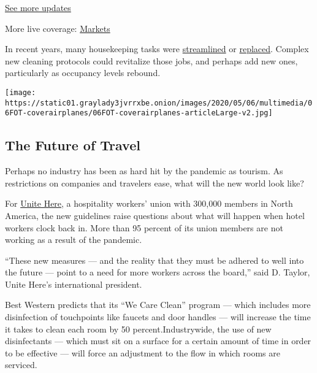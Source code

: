 \href{https://www.nytimes3xbfgragh.onion/2020/09/08/world/covid-19-coronavirus.html?action=click\&pgtype=Article\&state=default\&region=MAIN_CONTENT_1\&context=storylines_live_updates}{See
more updates}

More live coverage:
\href{https://www.nytimes3xbfgragh.onion/live/2020/09/08/business/stock-market-today-coronavirus?action=click\&pgtype=Article\&state=default\&region=MAIN_CONTENT_1\&context=storylines_live_updates}{Markets}

In recent years, many housekeeping tasks were
\href{https://www.nytimes3xbfgragh.onion/2019/11/26/business/hotel-housekeepers.html}{streamlined}
or
\href{https://www.nytimes3xbfgragh.onion/2018/02/27/travel/skipping-hotel-housekeeping-perks.html}{replaced}.
Complex new cleaning protocols could revitalize those jobs, and perhaps
add new ones, particularly as occupancy levels rebound.

\href{https://www.nytimes3xbfgragh.onion/interactive/2020/05/06/travel/coronavirus-travel-questions.html}{}

\texttt{[image: https://static01.graylady3jvrrxbe.onion/images/2020/05/06/multimedia/06FOT-coverairplanes/06FOT-coverairplanes-articleLarge-v2.jpg]}

\hypertarget{the-future-of-travel}{%
\subsection{The Future of Travel}\label{the-future-of-travel}}

Perhaps no industry has been as hard hit by the pandemic as tourism. As
restrictions on companies and travelers ease, what will the new world
look like?

For \href{https://unitehere.org/}{Unite Here}, a hospitality workers'
union with 300,000 members in North America, the new guidelines raise
questions about what will happen when hotel workers clock back in. More
than 95 percent of its union members are not working as a result of the
pandemic.

``These new measures --- and the reality that they must be adhered to
well into the future --- point to a need for more workers across the
board,'' said D. Taylor, Unite Here's international president.

Best Western predicts that its ``We Care Clean'' program --- which
includes more disinfection of touchpoints like faucets and door handles
--- will increase the time it takes to clean each room by 50
percent.Industrywide, the use of new disinfectants --- which must sit on
a surface for a certain amount of time in order to be effective --- will
force an adjustment to the flow in which rooms are serviced.

